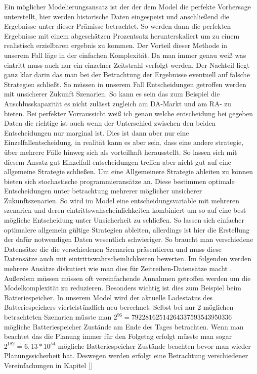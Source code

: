 Ein möglicher Modelierungsansatz ist der der dem Model die perfekte Vorhersage unterstellt, hier werden historische
Daten eingespeist und anschließend die Ergebnisse
unter dieser Prämisse betrachtet. So werden dann die perfekten Ergebnisse mit einem abgeschätzen Prozentsatz herunterskaliert um zu einem
realistisch erzielbaren ergebnis zu kommen. Der Vorteil dieser Methode in unserem Fall läge in der einfachen Komplexität. Da man immer
genau weiß was eintritt muss auch nur ein einzelner Zeitstrahl verfolgt werden.
Der Nachteil liegt ganz klar darin das man bei der Betrachtung der Ergebnisse eventuell auf falsche Strategien schließt.
So müssen in  unserem Fall Entscheidungen getroffen werden mit unsicherer Zukunft Szenarien.
So kann es sein das zum Beispiel die Anschlusskapazität es nicht zulässt zugleich am DA-Markt und am RA- zu bieten.
 Bei perfekter Vorraussicht weiß ich genau welche entscheidung bei gegeben Daten die richtige ist auch wenn
der Unterschied zwischen den beiden Entscheidungen nur marginal ist.
Dies ist dann aber nur eine Einzelfallentscheidung, in realität kann es aber sein, dass eine andere strategie, über mehrere Fälle hinweg sich
als vorteilhaft herausstellt.
So lassen sich mit diesem Ansatz gut Einzelfall entscheidungen treffen aber nicht gut auf eine allgemeine Strategie schließen.
Um eine Allgemeinere Strategie ableiten zu können bieten sich stochastische programmieransätze an. Diese bestimmen optimale Entscheidungen
unter betrachtung  mehrerer möglicher unsicherer Zukunftszenarien. So wird im Model eine entscheidungsvariable mit mehreren szenarien und deren
eintrittswahscheinlichkeiten kombiniert um so auf eine best mögliche Entscheidung unter Unsicherheit zu schließen.
So lassen sich einfacher optimalere allgemein gültige Strategien ableiten, allerdings ist hier die Erstellung der dafür notwendigen Daten wesentlich
schwieriger. So braucht man verschiedene Datensätze die die verschiedenen Szenarien präsentieren und muss diese Datensätze auch mit eintrittswahrscheinlichkeiten bewerten.
Im folgenden werden mehrere Ansätze diskutiert wie man dies für Zeitreihen-Datensätze macht .
Außerdem müssen müssen oft vereinfachende Annahmen getroffen werden um die Modelkomplexität zu reduzieren.
Besonders wichtig ist dies zum Beispiel beim Batteriespeicher. In unserem Model wird der aktuelle Ladestatus des Batteriespeichers viertelstündlich neu berechnet. Selbst bei nur 2 möglichen betrachteten Szenarien
müsste man $ 2^{96} = 79228162514264337593543950336$ mögliche Batteriespeicher Zustände am Ende des Tages betrachten. Wenn man beachtet das die Planung immer für den Folgetag erfolgt
müsste man sogar $2^{182} = 6,13* 10^{54}$ mögliche Batteriespeicher Zustände beachten bevor man wieder Planungssicherheit hat. Deswegen werden erfolgt eine Betrachtung verschiedener Vereinfachungen in Kapitel []
\\
\\

